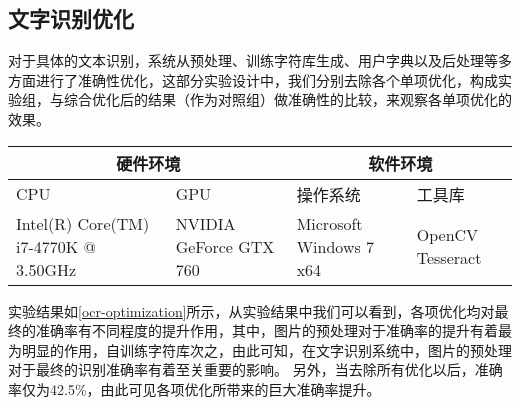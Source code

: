 \subsection{文字识别优化}
对于具体的文本识别，系统从预处理、训练字符库生成、用户字典以及后处理等多方面进行了准确性优化，这部分实验设计中，我们分别去除各个单项优化，构成实验组，与综合优化后的结果（作为对照组）做准确性的比较，来观察各单项优化的效果。
\begin{table}[!htbp]
	\label{ocr-optimization}
	\centering
	\vspace{10pt}
  \renewcommand\arraystretch{1.5}  %
	\begin{tabular}{p{3cm}|p{3cm}|p{3cm}|p{3cm}}
    \hline
    \multicolumn{2}{c|}{硬件环境} & \multicolumn{2}{c}{软件环境} \\
		\hline
    CPU&GPU&操作系统&工具库 \\
		\hline
    Intel(R) Core(TM)  i7-4770K @ 3.50GHz & NVIDIA GeForce  GTX 760 & Microsoft  Windows 7 x64 & OpenCV  Tesseract \\
    \hline
	\end{tabular}
\end{table}
实验结果如\autoref{ocr-optimization}所示，从实验结果中我们可以看到，各项优化均对最终的准确率有不同程度的提升作用，其中，图片的预处理对于准确率的提升有着最为明显的作用，自训练字符库次之，由此可知，在文字识别系统中，图片的预处理对于最终的识别准确率有着至关重要的影响。
另外，当去除所有优化以后，准确率仅为42.5\%，由此可见各项优化所带来的巨大准确率提升。

